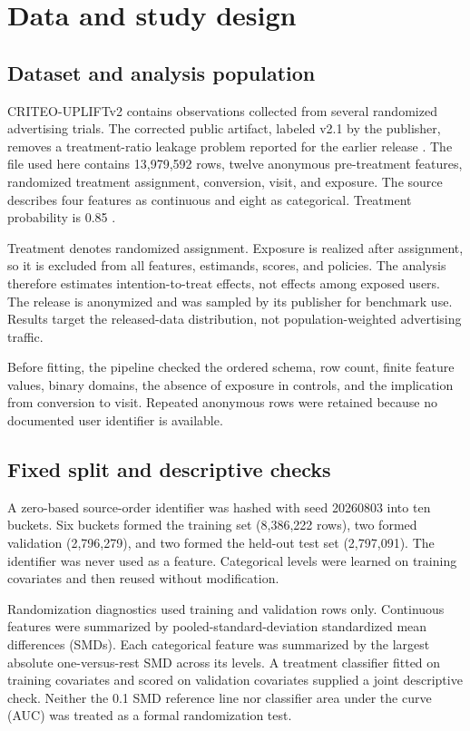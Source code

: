\documentclass[11pt]{article}
\begin{document}
\section{Data and study design}

\subsection{Dataset and analysis population}

CRITEO-UPLIFTv2 contains observations collected from several randomized advertising trials. The corrected public artifact, labeled v2.1 by the publisher, removes a treatment-ratio leakage problem reported for the earlier release \citep{diemert2021benchmark}. The file used here contains 13,979,592 rows, twelve anonymous pre-treatment features, randomized treatment assignment, conversion, visit, and exposure. The source describes four features as continuous and eight as categorical. Treatment probability is 0.85 \citep{criteoDataset,diemert2021benchmark}.

Treatment denotes randomized assignment. Exposure is realized after assignment, so it is excluded from all features, estimands, scores, and policies. The analysis therefore estimates intention-to-treat effects, not effects among exposed users. The release is anonymized and was sampled by its publisher for benchmark use. Results target the released-data distribution, not population-weighted advertising traffic.

Before fitting, the pipeline checked the ordered schema, row count, finite feature values, binary domains, the absence of exposure in controls, and the implication from conversion to visit. Repeated anonymous rows were retained because no documented user identifier is available.

\subsection{Fixed split and descriptive checks}

A zero-based source-order identifier was hashed with seed 20260803 into ten buckets. Six buckets formed the training set (8,386,222 rows), two formed validation (2,796,279), and two formed the held-out test set (2,797,091). The identifier was never used as a feature. Categorical levels were learned on training covariates and then reused without modification.

Randomization diagnostics used training and validation rows only. Continuous features were summarized by pooled-standard-deviation standardized mean differences (SMDs). Each categorical feature was summarized by the largest absolute one-versus-rest SMD across its levels. A treatment classifier fitted on training covariates and scored on validation covariates supplied a joint descriptive check. Neither the 0.1 SMD reference line nor classifier area under the curve (AUC) was treated as a formal randomization test.
\end{document}
